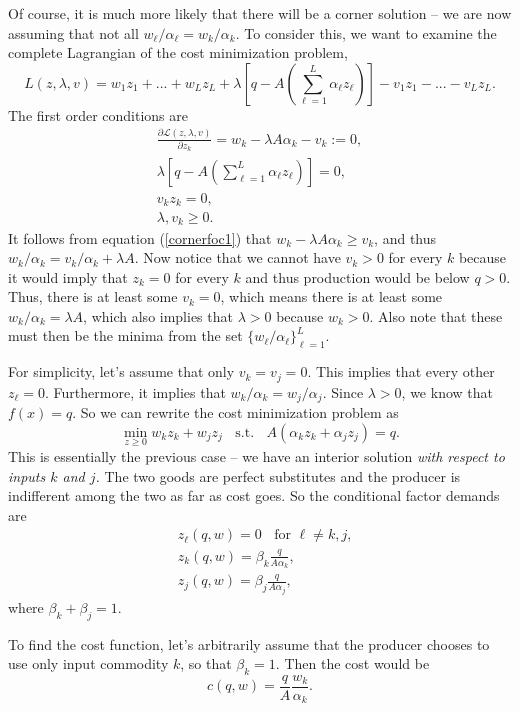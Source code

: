 \documentclass[12pt]{article}
\theoremstyle{definition}
\begin{document}
Of course, it is much more likely that there will be a corner solution -- we are now assuming that not all $w_{\ell}/\alpha_{\ell} = w_k/\alpha_k$. To consider this, we want to examine the complete Lagrangian of the cost minimization problem,
	\[L(z, \lambda, v) = w_1z_1 + ... + w_Lz_L + \lambda \left[ q - A \left(\sum_{\ell = 1}^L \alpha_{\ell} z_{\ell} \right) \right] -v_1z_1 - ... - v_Lz_L.	\]
The first order conditions are
\begin{align}
	\frac{\partial \mathcal{L}(z, \lambda, v)}{\partial z_k} = w_k - \lambda A \alpha_k - v_k :=0, \label{cornerfoc1}\\
	 \lambda \left[ q - A \left(\sum_{\ell = 1}^L \alpha_{\ell} z_{\ell} \right) \right] =0,\\
	 v_kz_k =0,\\
	 \lambda, v_k \geq 0.
\end{align}
It follows from equation (\ref{cornerfoc1}) that $w_k - \lambda A \alpha_k \geq v_k$, and thus $w_k/\alpha_k = v_k/\alpha_k +  \lambda A$. Now notice that we cannot have $v_k>0$ for every $k$ because it would imply that $z_k=0$ for every $k$ and thus production would be below $q>0$.  Thus, there is at least some $v_k=0$, which means there is at least some $w_k/\alpha_k = \lambda A$, which also implies that $\lambda >0$ because $w_k>0$. Also note that these must then be the minima from the set $\{w_{\ell}/\alpha_{\ell}\}_{\ell=1}^L$.

For simplicity, let's assume that only $v_k = v_j=0$. This implies that every other $z_{\ell} =0$. Furthermore, it implies that $w_k/\alpha_k = w_j/\alpha_j$. Since $\lambda > 0$, we know that $f(x)=q$. So we can rewrite the cost minimization problem as
	\[\min_{z \geq 0} w_kz_k + w_jz_j \;\; \text{ s.t. } \;\; A(\alpha_k z_k + \alpha_j z_j) = q.	\]
This is essentially the previous case -- we have an interior solution \emph{with respect to inputs $k$ and $j$.} The two goods are perfect substitutes and the producer is indifferent among the two as far as cost goes. So the conditional factor demands are
\begin{align*}
	&z_{\ell}(q,w) =0 \;\; \text{ for } \ell \neq k,j,\\
	&z_k(q,w) = \beta_k \frac{q}{A \alpha_k},\\
	&z_j(q,w) = \beta_j \frac{q}{A \alpha_j}, 
\end{align*}
where $\beta_k + \beta_j =1.$

To find the cost function, let's arbitrarily assume that the producer chooses to use only input commodity $k$, so that $\beta_k=1$. Then the cost would be
	\[c(q,w)= \frac{q}{A} \frac{ w_k}{ \alpha_k}.	\]
\end{document}

